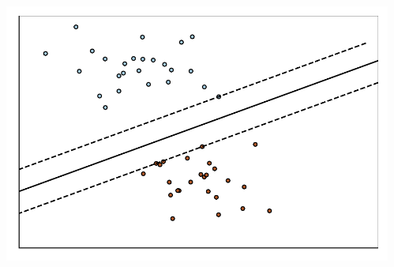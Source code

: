 \documentclass[aspectratio=43,spanish]{beamer}
\begin{document}
\begin{frame}
\begin{columns}
\begin{column}{0.5\textwidth}
            \end{column}
            \begin{column}{0.5\textwidth}  %
                \begin{center}
                  \includegraphics[width=\textwidth]{Chapter2/SeparableProblem/maxmargin_boundary.pdf}
                 \end{center}
            \end{column}
      \end{columns}

\end{frame}
\end{document}
